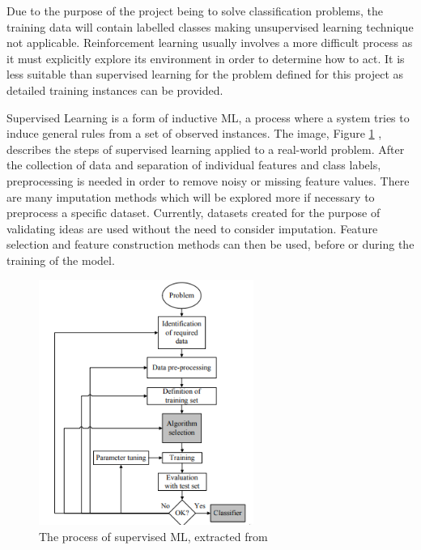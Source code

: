 Due to the purpose of the project being to solve classification problems, the training data will contain labelled classes making unsupervised learning technique not applicable. Reinforcement learning usually involves a more difficult process as it must explicitly explore its environment in order to determine how to act.  It is less suitable than supervised learning for the problem defined for this project as detailed training instances can be provided.

Supervised Learning is a form of inductive ML, a process where a system tries to induce general rules from a set of observed instances. The image, Figure \ref{fig:supervisedLearning} \cite{kotsiantis2007supervised}, describes the steps of supervised learning applied to a real-world problem. After the collection of data and separation of individual features and class labels, preprocessing is needed in order to remove noisy or missing feature values. There are many imputation methods which will be explored more if necessary to preprocess a specific dataset. Currently, datasets created for the purpose of validating ideas are used without the need to consider imputation. Feature selection and feature construction methods can then be used, before or during the training of the model.

\begin{figure} [H]
	\begin{center}
		\includegraphics[width=70mm, scale=0.5]{supervisedLearning.png}
		\caption{ The process of supervised ML, extracted from \cite{kotsiantis2007supervised}}
		\label{fig:supervisedLearning}
	\end{center}
	
\end{figure}

